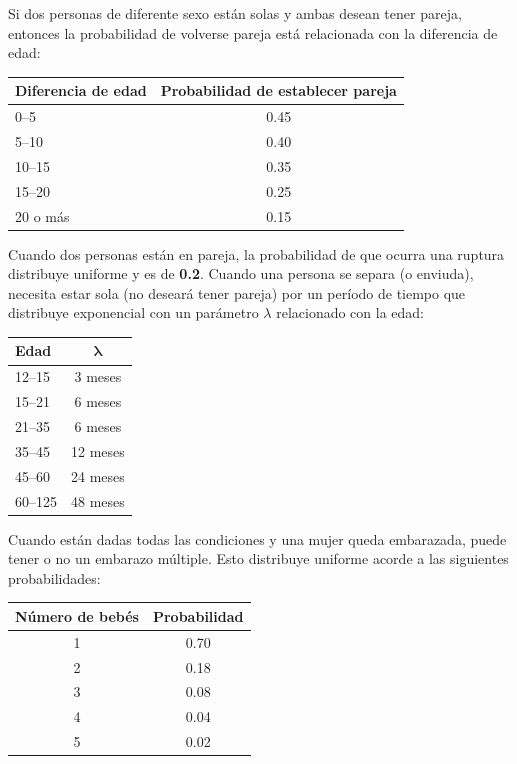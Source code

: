 \documentclass[12pt,a4paper]{article}
\begin{document}
Si dos personas de diferente sexo están solas y ambas desean tener pareja, entonces la probabilidad de volverse pareja está relacionada con la diferencia de edad:

\begin{center}
\begin{tabular}{lc}
\toprule
\textbf{Diferencia de edad} & \textbf{Probabilidad de establecer pareja} \\
\midrule
0--5      & 0.45 \\
5--10     & 0.40 \\
10--15    & 0.35 \\
15--20    & 0.25 \\
20 o más  & 0.15 \\
\bottomrule
\end{tabular}
\end{center}


Cuando dos personas están en pareja, la probabilidad de que ocurra una ruptura distribuye uniforme y es de \textbf{0.2}. Cuando una persona se separa (o enviuda), necesita estar sola (no deseará tener pareja) por un período de tiempo que distribuye exponencial con un parámetro $\lambda$ relacionado con la edad:

\begin{center}
\begin{tabular}{lc}
\toprule
\textbf{Edad} & $\boldsymbol{\lambda}$ \\
\midrule
12--15  & 3 meses  \\
15--21  & 6 meses  \\
21--35  & 6 meses  \\
35--45  & 12 meses \\
45--60  & 24 meses \\
60--125 & 48 meses \\
\bottomrule
\end{tabular}
\end{center}



Cuando están dadas todas las condiciones y una mujer queda embarazada, puede tener o no un embarazo múltiple. Esto distribuye uniforme acorde a las siguientes probabilidades:

\begin{center}
\begin{tabular}{cc}
\toprule
\textbf{Número de bebés} & \textbf{Probabilidad} \\
\midrule
1 & 0.70 \\
2 & 0.18 \\
3 & 0.08 \\
4 & 0.04 \\
5 & 0.02 \\
\bottomrule
\end{tabular}
\end{center}
\end{document}
